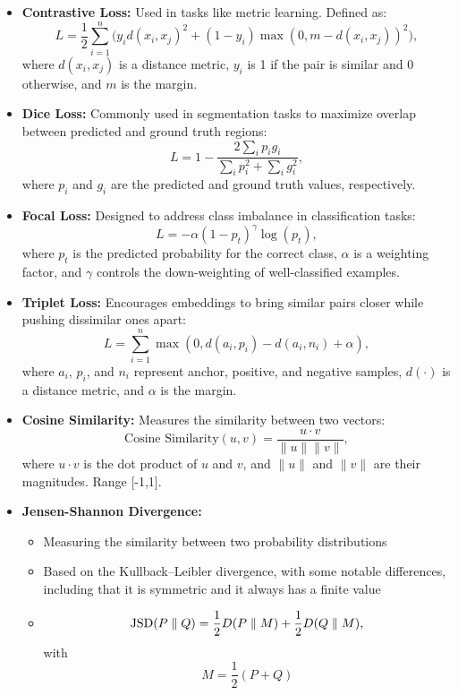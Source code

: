 \documentclass[12pt,a4paper]{article}
\begin{document}
\begin{itemize}
\item \textbf{Contrastive Loss:} Used in tasks like metric learning. Defined as:
    \[
    L = \frac{1}{2} \sum_{i=1}^n \Big( y_i d(x_i, x_j)^2 + (1 - y_i) \max(0, m - d(x_i, x_j))^2 \Big),
    \]
    where \(d(x_i, x_j)\) is a distance metric, \(y_i\) is 1 if the pair is similar and 0 otherwise, and \(m\) is the margin.

\item \textbf{Dice Loss:} Commonly used in segmentation tasks to maximize overlap between predicted and ground truth regions:
    \[
    L = 1 - \frac{2 \sum_i p_i g_i}{\sum_i p_i^2 + \sum_i g_i^2},
    \]
    where \(p_i\) and \(g_i\) are the predicted and ground truth values, respectively.

\item \textbf{Focal Loss:} Designed to address class imbalance in classification tasks:
    \[
    L = -\alpha (1 - p_t)^\gamma \log(p_t),
    \]
    where \(p_t\) is the predicted probability for the correct class, \(\alpha\) is a weighting factor, and \(\gamma\) controls the down-weighting of well-classified examples.

\item \textbf{Triplet Loss:} Encourages embeddings to bring similar pairs closer while pushing dissimilar ones apart:
    \[
    L = \sum_{i=1}^n \max(0, d(a_i, p_i) - d(a_i, n_i) + \alpha),
    \]
    where \(a_i\), \(p_i\), and \(n_i\) represent anchor, positive, and negative samples, \(d(\cdot)\) is a distance metric, and \(\alpha\) is the margin.

\item \textbf{Cosine Similarity:} Measures the similarity between two vectors:
    \[
    \text{Cosine Similarity}(u, v) = \frac{u \cdot v}{\|u\| \|v\|},
    \]
    where \(u \cdot v\) is the dot product of \(u\) and \(v\), and \(\|u\|\) and \(\|v\|\) are their magnitudes. Range [-1,1].
    \item \textbf{Jensen-Shannon Divergence:} 
\begin{itemize}
    \item Measuring the similarity between two probability distributions
    \item Based on the Kullback–Leibler divergence, with some notable differences, including that it is symmetric and it always has a finite value
    \item \[{\displaystyle {\rm {JSD}}(P\parallel Q)={\frac {1}{2}}D(P\parallel M)+{\frac {1}{2}}D(Q\parallel M),}\] with \[{\displaystyle M={\frac {1}{2}}(P+Q)}\]
\end{itemize}

\end{itemize}
\end{document}
